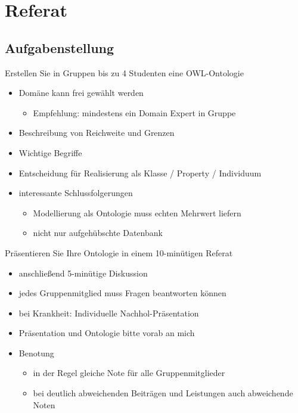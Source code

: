 \documentclass[a4paper]{article}
\title{\docTitle}
\author{Moritz}
\date{\today}
\begin{document}
\maketitle
\tableofcontents

\section{Referat}

\subsection{Aufgabenstellung}

Erstellen Sie in Gruppen bis zu 4 Studenten eine OWL-Ontologie

\begin{itemize}
    \item Domäne kann frei gewählt werden
    \begin{itemize}
        \item Empfehlung: mindestens ein Domain Expert in Gruppe
    \end{itemize}
    \item Beschreibung von Reichweite und Grenzen
    \item Wichtige Begriffe
    \item Entscheidung für Realisierung als Klasse / Property / Individuum
    \item interessante Schlussfolgerungen
    \begin{itemize}
        \item Modellierung als Ontologie muss echten Mehrwert liefern
        \item nicht nur aufgehübschte Datenbank
    \end{itemize}
\end{itemize}

Präsentieren Sie Ihre Ontologie in einem 10-minütigen Referat

\begin{itemize}
    \item anschließend 5-minütige Diskussion
    \item jedes Gruppenmitglied muss Fragen beantworten können
    \item bei Krankheit: Individuelle Nachhol-Präsentation
    \item Präsentation und Ontologie bitte vorab an mich
    \item Benotung
    \begin{itemize}
        \item in der Regel gleiche Note für alle Gruppenmitglieder
        \item bei deutlich abweichenden Beiträgen und Leistungen auch abweichende Noten
    \end{itemize}
\end{itemize}
\end{document}

